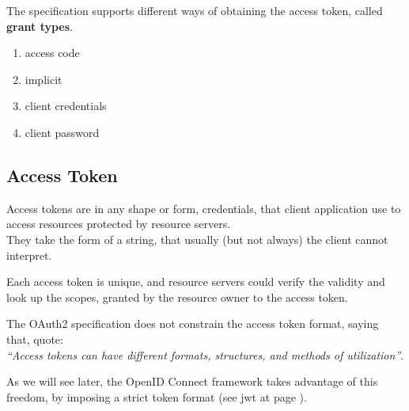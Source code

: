 The specification supports different ways of obtaining the access token, called
\textbf{grant types}.
\begin{enumerate}
    \item access code
    \item implicit
    \item client credentials
    \item client password
\end{enumerate}

\subsection{Access Token}
Access tokens are in any shape or form, credentials, that client application use
to access resources protected by resource servers.
\\
They take the form of a string, that usually (but not always) the client cannot
interpret.

Each access token is unique, and resource servers could verify the validity and
look up the scopes, granted by the resource owner to the access token.

The OAuth2 specification does not constrain the access token format, saying
that, quote: \\
\textit{``Access tokens can have different formats, structures, and methods of
utilization''}.

As we will see later, the OpenID Connect framework takes advantage of this
freedom, by imposing a strict token format (see \ac{jwt} at page \pageref{jwt}).

